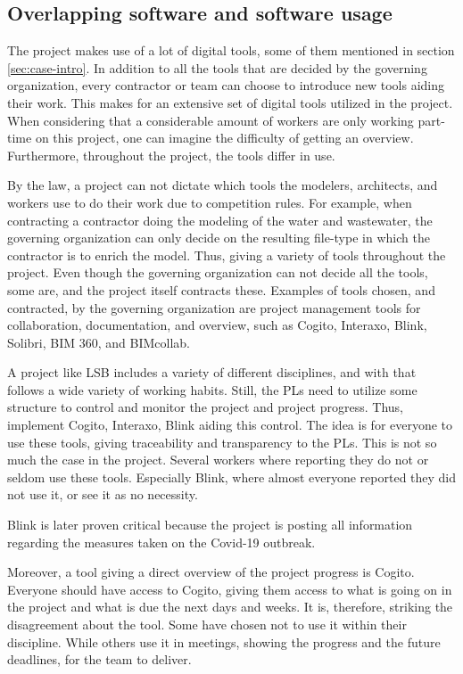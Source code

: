 \subsection{Overlapping software and software usage} \label{sec:unmitigated}
The project makes use of a lot of digital tools, some of them mentioned in section \ref{sec:case-intro}. In addition to all the tools that are decided by the governing organization, every contractor or team can choose to introduce new tools aiding their work. This makes for an extensive set of digital tools utilized in the project. When considering that a considerable amount of workers are only working part-time on this project, one can imagine the difficulty of getting an overview. Furthermore, throughout the project, the tools differ in use. 

By the law, a project can not dictate which tools the modelers, architects, and workers use to do their work due to competition rules. For example, when contracting a contractor doing the modeling of the water and wastewater, the governing organization can only decide on the resulting file-type in which the contractor is to enrich the model. Thus, giving a variety of tools throughout the project. Even though the governing organization can not decide all the tools, some are, and the project itself contracts these. Examples of tools chosen, and contracted, by the governing organization are project management tools for collaboration, documentation, and overview, such as Cogito, Interaxo, Blink, Solibri, BIM 360, and BIMcollab.

A project like LSB includes a variety of different disciplines, and with that follows a wide variety of working habits. Still, the PLs need to utilize some structure to control and monitor the project and project progress. Thus, implement Cogito, Interaxo, Blink aiding this control. The idea is for everyone to use these tools, giving traceability and transparency to the PLs. This is not so much the case in the project. Several workers where reporting they do not or seldom use these tools. Especially Blink, where almost everyone reported they did not use it, or see it as no necessity. 

Blink is later proven critical because the project is posting all information regarding the measures taken on the Covid-19 outbreak.

Moreover, a tool giving a direct overview of the project progress is Cogito.  Everyone should have access to Cogito, giving them access to what is going on in the project and what is due the next days and weeks. It is, therefore, striking the disagreement about the tool. Some have chosen not to use it within their discipline. While others use it in meetings, showing the progress and the future deadlines, for the team to deliver. 

